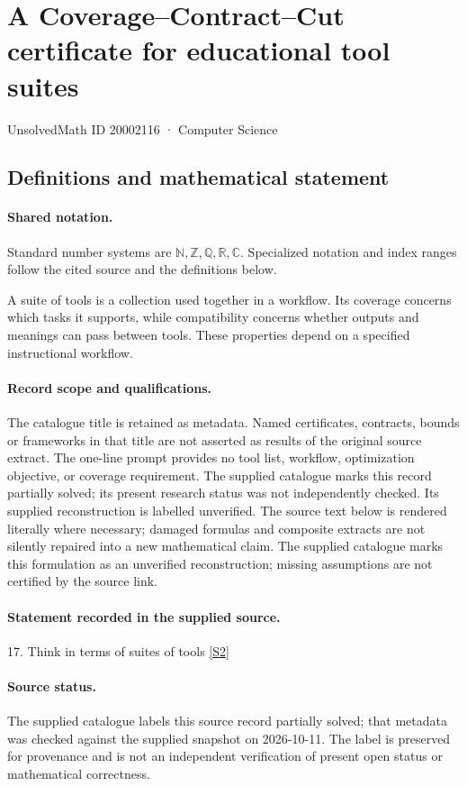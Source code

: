 \documentclass[11pt]{article}
\newcommand{\sref}[2]{\hyperlink{source:#1:#2}{[S#2]}}
\begin{document}
\setcounter{section}{20002115}
\section{A Coverage--Contract--Cut certificate for educational tool suites}\label{20002116}
{\small\sffamily UnsolvedMath ID 20002116 · Computer Science}
\subsection{Definitions and mathematical statement}

\paragraph{Shared notation.}Standard number systems are $\mathbb N,\mathbb Z,\mathbb Q,\mathbb R,\mathbb C$. Specialized notation and index ranges follow the cited source and the definitions below.


A suite of tools is a collection used together in a workflow. Its coverage concerns which tasks it supports, while compatibility concerns whether outputs and meanings can pass between tools. These properties depend on a specified instructional workflow.
\paragraph{Record scope and qualifications.}
The catalogue title is retained as metadata. Named certificates, contracts, bounds or frameworks in that title are not asserted as results of the original source extract.
The one-line prompt provides no tool list, workflow, optimization objective, or coverage requirement. The supplied catalogue marks this record partially solved; its present research status was not independently checked. Its supplied reconstruction is labelled unverified.
The source text below is rendered literally where necessary; damaged formulas and composite extracts are not silently repaired into a new mathematical claim.
The supplied catalogue marks this formulation as an unverified reconstruction; missing assumptions are not certified by the source link.
\paragraph{Statement recorded in the supplied source.}
17. Think in terms of suites of tools \sref{20002116}{2}
\paragraph{Source status.}
The supplied catalogue labels this source record partially solved; that metadata was checked against the supplied snapshot on 2026-10-11. The label is preserved for provenance and is not an independent verification of present open status or mathematical correctness.
\end{document}
